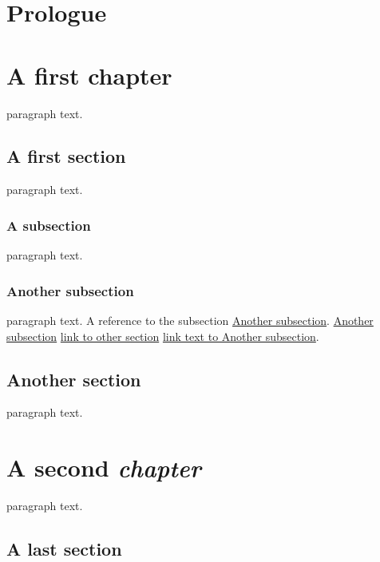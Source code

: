 \chapter*{Prologue}
\label{s:1}
\chapter{A first chapter}
\label{s:2}
\setcounter{tocdepth}{3}
\minitoc

paragraph text.

\section{A first section}
\label{s:3}
paragraph text.

\subsection{A subsection}
\label{s:4}
paragraph text.

\subsection{Another subsection}
\label{s:5}
paragraph text. A reference to the subsection
\hyperref[s:5]{Another subsection}.
\hyperref[s:5]{Another subsection}
\hyperref[s:5]{link to other section}
\hyperref[s:5]{link text to Another subsection}.

\section{Another section}
\label{s:6}
paragraph text.

\chapter{A second \emph{chapter}}
\label{s:7}
paragraph text.

\section{A last section}
\label{s:8}
\setcounter{tocdepth}{3}
\tableofcontents
\setcounter{tocdepth}{0}
\tableofcontents
\setcounter{tocdepth}{3}
\tableofcontents
\setcounter{tocdepth}{3}
\tableofcontents
\setcounter{tocdepth}{3}
\minitoc
